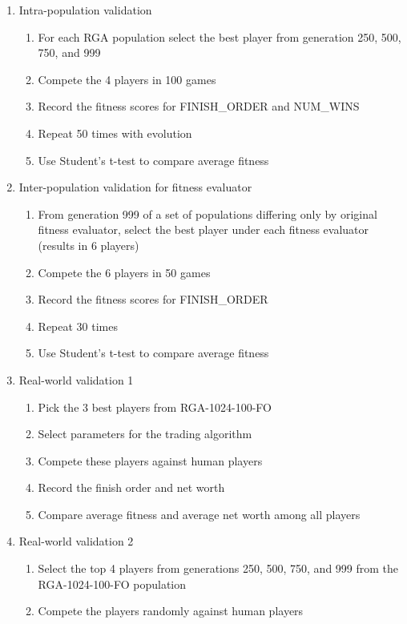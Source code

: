 \begin{enumerate}
  \item {Intra-population validation}
  \begin{enumerate}
    \item {For each RGA population select the best player from generation 250,
    500, 750, and 999}
    \item {Compete the 4 players in 100 games}
    \item {Record the fitness scores for FINISH\_ORDER and NUM\_WINS}
    \item {Repeat 50 times with evolution}
    \item {Use Student's t-test to compare average fitness}
  \end{enumerate}
  \item {Inter-population validation for fitness evaluator}
  \begin{enumerate}
    \item {From generation 999 of a set of populations differing only by
    original fitness evaluator, select the best player under each fitness
    evaluator (results in 6 players)}
    \item {Compete the 6 players in 50 games}
    \item {Record the fitness scores for FINISH\_ORDER}
    \item {Repeat 30 times}
    \item {Use Student's t-test to compare average fitness}
  \end {enumerate}
  \item {Real-world validation 1}
  \begin{enumerate}
    \item {Pick the 3 best players from RGA-1024-100-FO}
    \item {Select parameters for the trading algorithm}
    \item {Compete these players against human players}   
    \item {Record the finish order and net worth}
    \item {Compare average fitness and average net worth among all players}
  \end{enumerate}
  \item {Real-world validation 2}
  \begin{enumerate}
    \item {Select the top 4 players from generations 250, 500, 750, and 999 from
    the RGA-1024-100-FO population}
    \item {Compete the players randomly against human players}

\end{enumerate}
\end{enumerate}
